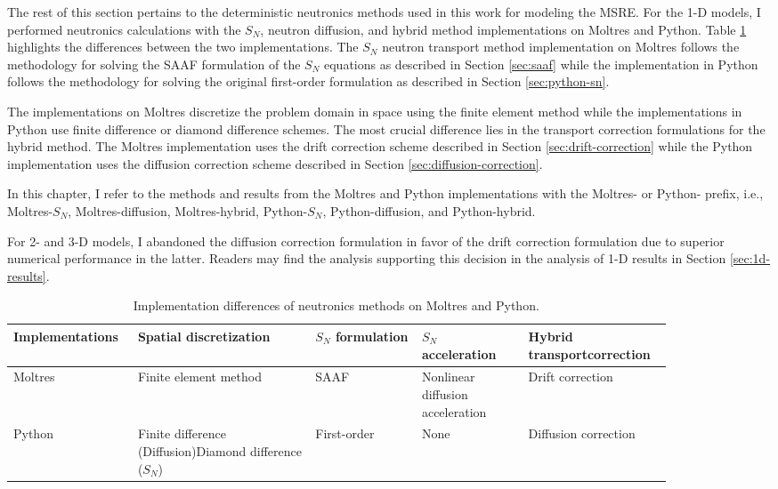 The rest of this section pertains to the deterministic neutronics methods used in this work for
modeling the \gls{MSRE}.
For the 1-D models, I performed neutronics calculations with the $S_N$, neutron diffusion, and
hybrid method implementations on Moltres and Python. Table \ref{table:nts-methods} highlights the
differences between the two implementations. The $S_N$ neutron transport method implementation on
Moltres follows the methodology for solving the \gls{SAAF} formulation of the $S_N$ equations as
described in Section \ref{sec:saaf} while the implementation in Python follows the methodology
for solving the original first-order formulation as described in Section \ref{sec:python-sn}.

The implementations on Moltres discretize the problem domain in space using the finite element
method while the implementations in Python use finite difference or diamond difference schemes. The
most crucial difference lies in the transport correction formulations for the hybrid method. The
Moltres implementation uses the drift correction scheme described in Section
\ref{sec:drift-correction} while the Python implementation uses the diffusion correction
scheme described in Section \ref{sec:diffusion-correction}.

In this chapter, I refer to the methods and results from the Moltres and Python implementations
with the Moltres- or Python- prefix, i.e., Moltres-$S_N$, Moltres-diffusion, Moltres-hybrid,
Python-$S_N$, Python-diffusion, and Python-hybrid.

For 2- and 3-D models, I abandoned the diffusion correction formulation in favor of the drift
correction formulation due to superior numerical performance in the latter. Readers may find the
analysis supporting this decision in the analysis of 1-D results in Section \ref{sec:1d-results}.

\begin{table}[htb!]
  \centering
  \footnotesize
  \caption{Implementation differences of neutronics methods on Moltres and Python.}
  \begin{tabular}{p{0.14\linewidth} p{0.25\linewidth} p{0.15\linewidth} p{0.15\linewidth} p{0.17\linewidth}}
    \toprule
    Implementations & Spatial discretization & $S_N$ formulation & $S_N$ acceleration &
    Hybrid transport\newline correction \\
    \midrule
    Moltres & Finite element method & SAAF & Nonlinear diffusion acceleration & Drift correction \\
    Python & Finite difference (Diffusion)\newline Diamond difference ($S_N$) & First-order & None & Diffusion correction \\
    \bottomrule
  \end{tabular}
  \label{table:nts-methods}
\end{table}

